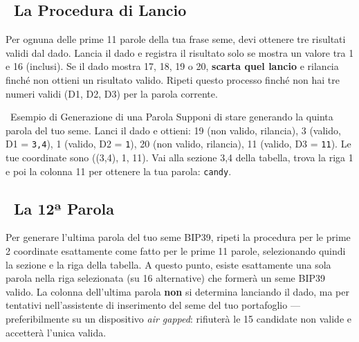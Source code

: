 \documentclass[10pt]{article}
\begin{document}
\subsection*{~La Procedura di Lancio}

Per ognuna delle prime 11 parole della tua frase seme, devi ottenere tre risultati validi dal dado. Lancia il dado e registra il risultato solo se mostra un valore tra 1 e 16 (inclusi). Se il dado mostra 17, 18, 19 o 20, \textbf{scarta quel lancio} e rilancia finché non ottieni un risultato valido. Ripeti questo processo finché non hai tre numeri validi (D1, D2, D3) per la parola corrente.

\begin{examplebox}{\faLightbulb~Esempio di Generazione di una Parola}
Supponi di stare generando la quinta parola del tuo seme. Lanci il dado e ottieni: 19 (non valido, rilancia), 3 (valido, D1 = \texttt{3,4}), 1 (valido, D2 = \texttt{1}), 20 (non valido, rilancia), 11 (valido, D3 = \texttt{11}). Le tue coordinate sono ((3,4), 1, 11). Vai alla sezione 3,4 della tabella, trova la riga 1 e poi la colonna 11 per ottenere la tua parola: \texttt{candy}.
\end{examplebox}

\subsection*{\faPen~La 12ª Parola}

Per generare l'ultima parola del tuo seme BIP39, ripeti la procedura per le prime 2 coordinate esattamente come fatto per le prime 11 parole, selezionando quindi la sezione e la riga della tabella. A questo punto, esiste esattamente una sola parola nella riga selezionata (su 16 alternative) che formerà un seme BIP39 valido. La colonna dell'ultima parola \textbf{non} si determina lanciando il dado, ma per tentativi nell'assistente di inserimento del seme del tuo portafoglio --- preferibilmente su un dispositivo \textit{air gapped}: rifiuterà le 15 candidate non valide e accetterà l'unica valida.
\end{document}
